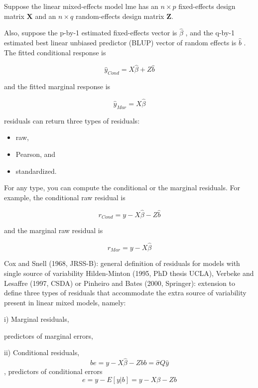 \documentclass[12pt, a4paper]{report}
\theoremstyle{plain}
\theoremstyle{definition}
\theoremstyle{remark}
\begin{document}
	Suppose the linear mixed-effects model lme has an $n \times p$ fixed-effects design matrix $\boldsymbol{X}$ and an $n \times q$ random-effects design matrix $\boldsymbol{Z}$. 
	
	Also, suppose the p-by-1 estimated fixed-effects vector is $\hat{\beta}$ , and the q-by-1 estimated best linear unbiased predictor (BLUP) 
	vector of random effects is $\hat{b}$ . The fitted conditional response is
	
	\[ \hat{y}_{Cond} = X \hat{\beta} + Z \hat{b} \]
	
	and the fitted marginal response is
	
	
	\[ \hat{y}_{Mar} = X \hat{\beta} \]
	
	residuals can return three types of residuals:
	\begin{itemize} 
		\item raw, 
		\item Pearson, and 
		\item standardized.\end{itemize} 
	
	For any type, you can compute the conditional or the marginal residuals. For example, the conditional raw residual is
	
	
	\[ r_{Cond} = y - X \hat{\beta} - Z \hat{b} \]
	
	and the marginal raw residual is
	
	
	
	\[ r_{Mar} = y - X \hat{\beta} \]
	
	\newpage
	
	Cox and Snell (1968, JRSS-B): general definition of residuals for
	models with single source of variability
	Hilden-Minton (1995, PhD thesis UCLA), Verbeke and Lesaffre
	(1997, CSDA) or Pinheiro and Bates (2000, Springer): extension to
	define three types of residuals that accommodate the extra source of
	variability present in linear mixed models, namely:
	
	i) Marginal residuals, 
	
	predictors of marginal errors, 
	
	
	ii) Conditional residuals, 
	\[be = y − X\hat{\beta} − Zbb = \hat{\sigma}Q\hat{y}\] , predictors of
	conditional errors 
	\[e = y − E[y|b] = y − X\beta − Zb\]
	
\end{document}
